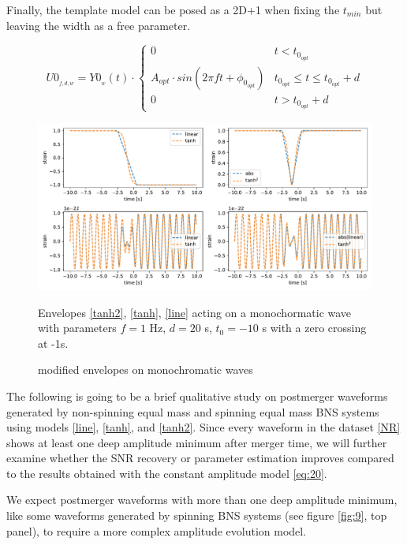 Finally, the template model can be posed as a 2D+1 when fixing the $t_{min}$ but leaving the width as a free parameter.

\begin{equation}\label{3dim-model}
U0_{_{f,d, w}} = Y0_{_{w}}(t) \cdot
\begin{cases} 
      0 & t<t_{0_{opt}} \\
      A_{opt} \cdot sin(2\pi f t + \phi_{0_{opt}}) & t_{0_{opt}} \leq t\leq t_{0_{opt}}+d \\
      0 & t>t_{0_{opt}}+d
   \end{cases}
\end{equation}

\begin{figure}[hbt!]
\begin{center}
\includegraphics[width=\textwidth, angle=0]{images/Data_analysis/results/envel.pdf}
\caption{modified envelopes on monochromatic waves}
\label{env.ex}
\end{center}
Envelopes \ref{tanh2}, \ref{tanh}, \ref{line} acting on a monochormatic wave with parameters $f=1$ Hz, $d=20$ s, $t_{0}=-10$ s with a zero crossing at -1s.
\end{figure}
\FloatBarrier


The following is going to be a brief qualitative study on postmerger waveforms generated by non-spinning equal mass and spinning equal mass BNS systems using models \ref{line}, \ref{tanh}, and \ref{tanh2}. Since every waveform in the dataset \ref{NR} shows at least one deep amplitude minimum after merger time, we will further examine whether the SNR recovery or parameter estimation improves compared to the results obtained with the constant amplitude model \ref{eq:20}.

We expect postmerger waveforms with more than one deep amplitude minimum, like some waveforms generated by spinning BNS systems (see figure \ref{fig:9}, top panel), to require a more complex amplitude evolution model.


